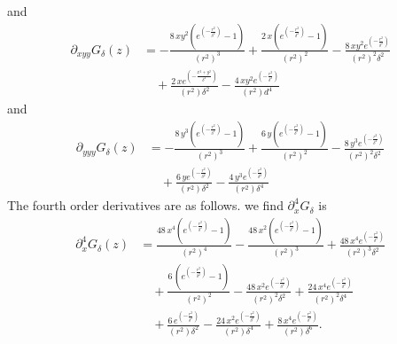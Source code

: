 \documentclass[12pt]{amsart}
\begin{document}
and
\begin{align*}
  \partial_{xyy}G_\delta (z) &= 
  - \frac{8 \, x y^{2} {\left(e^{\left(-\frac{r^{2}}{\delta^{2}}\right)}- 1\right)}}{{\left(r^{2}\right)}^{3}} 
  + \frac{2 \, x {\left(e^{\left(-\frac{r^{2}}{\delta^{2}}\right)} - 1\right)}}{{\left(r^{2}\right)}^{2}}
  - \frac{8 \, x y^{2} e^{\left(-\frac{r^{2}}{\delta^{2}}\right)}}{{\left(r^{2}\right)}^{2} \delta^{2}} \\
  &\quad + \frac{2 \, x e^{\left(-\frac{x^{2} + y^{2}}{\delta^{2}}\right)}}{{\left(r^{2}\right)} \delta^{2}}
  - \frac{4 \, x y^{2} e^{\left(-\frac{r^{2}}{\delta^{2}}\right)}}{{\left(r^{2}\right)} d^{4}}
\end{align*}
and
\begin{align*}
  \partial_{yyy}G_\delta (z) &= 
  - \frac{8 \, y^{3} {\left(e^{\left(-\frac{r^{2}}{\delta^{2}}\right)} - 1\right)}}{{\left(r^{2}\right)}^{3}} 
  + \frac{6 \, y {\left(e^{\left(-\frac{r^{2}}{\delta^{2}}\right)} - 1\right)}}{{\left(r^{2}\right)}^{2}} 
  - \frac{8 \, y^{3} e^{\left(-\frac{r^{2}}{\delta^{2}}\right)}}{{\left(r^{2}\right)}^{2} \delta^{2}}\\
  &\quad + \frac{6 \, y e^{\left(-\frac{r^{2}}{\delta^{2}}\right)}}{{\left(r^{2}\right)} \delta^{2}} 
  - \frac{4 \, y^{3} e^{\left(-\frac{r^{2}}{\delta^{2}}\right)}}{{\left(r^{2}\right)} \delta^{4}}
\end{align*}
The fourth order derivatives are as follows.
we find $\partial_{x}^4G_\delta$ is
\begin{align*}
  \partial_x^4 G_\delta(z) &= \frac{48 \, x^{4} {\left(e^{\left(-\frac{r^{2}}{\delta^{2}}\right)}- 1\right)}}{{\left(r^{2}\right)}^{4}}
  - \frac{48 \, x^{2} {\left(e^{\left(-\frac{r^{2}}{\delta^{2}}\right)} - 1\right)}}{{\left(r^{2}\right)}^{3}}
  + \frac{48 \, x^{4} e^{\left(-\frac{r^{2}}{\delta^{2}}\right)}}{{\left(r^{2}\right)}^{3} \delta^{2}} \\
  &\quad + \frac{6 \, {\left(e^{\left(-\frac{r^{2}}{\delta^{2}}\right)} - 1\right)}}{{\left(r^{2}\right)}^{2}} 
  - \frac{48 \, x^{2} e^{\left(-\frac{r^{2}}{\delta^{2}}\right)}}{{\left(r^{2}\right)}^{2} \delta^{2}} 
  + \frac{24 \, x^{4} e^{\left(-\frac{r^{2}}{\delta^{2}}\right)}}{{\left(r^{2}\right)}^{2} \delta^{4}} \\
  &\quad + \frac{6 \, e^{\left(-\frac{r^{2}}{\delta^{2}}\right)}}{{\left(r^{2}\right)} \delta^{2}} 
  - \frac{24 \, x^{2} e^{\left(-\frac{r^{2}}{\delta^{2}}\right)}}{{\left(r^{2}\right)} \delta^{4}} 
  + \frac{8 \,x^{4} e^{\left(-\frac{r^{2}}{\delta^{2}}\right)}}{{\left(r^{2}\right)} \delta^6}.
\end{align*}
\end{document}
